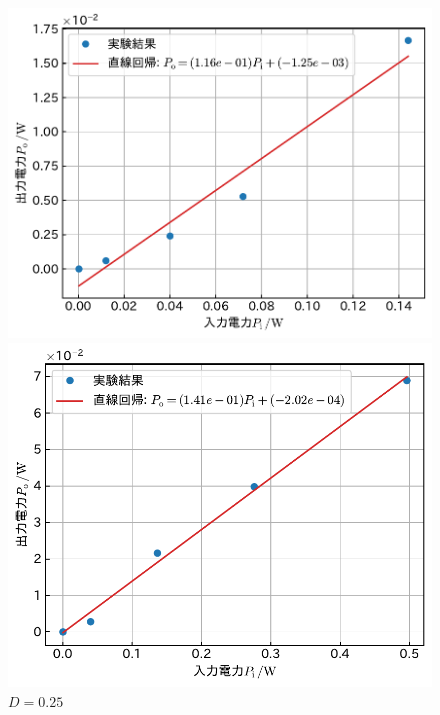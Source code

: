 \documentclass[1_power_supply.tex]{subfiles}
\begin{document}
	\begin{figure}[htbp]
		\begin{minipage}{0.45\columnwidth}
			\centering
			\includegraphics[width=0.8\columnwidth]{2_10p.pdf}
			\caption{$D=0.1$}\label{fig:2_10p}
		\end{minipage}
		\begin{minipage}{0.45\columnwidth}
			\centering
			\includegraphics[width=0.8\columnwidth]{2_25p.pdf}
			\caption{$D=0.25$}\label{fig:2_25p}
		\end{minipage}


\end{figure}
\end{document}
